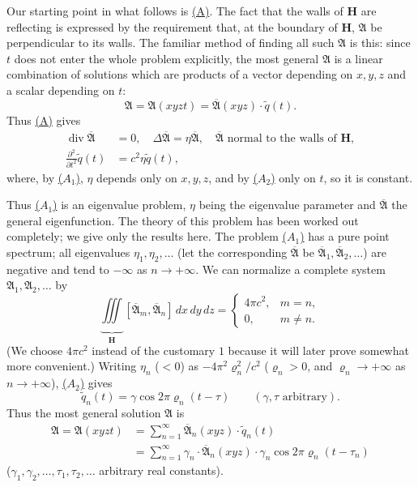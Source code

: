 \documentclass[fontsize=13pt,twoside,openany,headings=normal,parskip=false,bookmarkpackage=false,DIV=calc]{scrbook}
\begin{document}
Our starting point in what follows is \hyperref[eq:III.6.A]{(A)}. The fact that the walls of $\boldsymbol H$ are reflecting is expressed by the requirement that, at the boundary of $\boldsymbol H$, $\mathfrak A$ be perpendicular to its walls. The familiar method of finding all such $\mathfrak A$ is this: since $t$ does not enter the whole problem explicitly, the most general $\mathfrak A$ is a linear combination of solutions which are products of a vector depending on $x,y,z$ and a scalar depending on $t$:
\[
 \mathfrak A=\mathfrak A(xyzt)=\overline{\mathfrak A}(xyz)\cdot\widetilde q(t).
\]
Thus \hyperref[eq:III.6.A]{(A)} gives
\begin{align}
 \operatorname{div}\overline{\mathfrak A}&=0,\quad
 \Delta\overline{\mathfrak A}=\eta\overline{\mathfrak A},\quad
 \overline{\mathfrak A}\text{ normal to the walls of }\boldsymbol H,
 \tag{$A_1$}\label{eq:III.6.A1}\\
 \frac{\partial^2}{\partial t^2}\widetilde q(t)&=c^2\eta\widetilde q(t),
 \tag{$A_2$}\label{eq:III.6.A2}
\end{align}
where, by \hyperref[eq:III.6.A1]{($A_1$)}, $\eta$ depends only on $x,y,z$, and by \hyperref[eq:III.6.A2]{($A_2$)} only on $t$, so it is constant.

Thus \hyperref[eq:III.6.A1]{($A_1$)} is an eigenvalue problem, $\eta$ being the eigenvalue parameter and $\overline{\mathfrak A}$ the general eigenfunction. The theory of this problem has been worked out completely; we give only the results here. The problem \hyperref[eq:III.6.A1]{($A_1$)} has a pure point spectrum; all eigenvalues $\eta_1,\eta_2,\ldots$ (let the corresponding $\overline{\mathfrak A}$ be $\overline{\mathfrak A}_1,\overline{\mathfrak A}_2,\ldots$) are negative and tend to $-\infty$ as $n\longrightarrow+\infty$. We can normalize a complete system $\mathfrak A_1,\mathfrak A_2,\ldots$ by
\[
 \underbrace{\iiint}_{\boldsymbol H}[\overline{\mathfrak A}_m,\overline{\mathfrak A}_n]\,dx\,dy\,dz
 =\begin{cases}4\pi c^2,&m=n,\\0,&m\ne n.\end{cases}
\]
\hypertarget{origpage-138}{}%
(We choose $4\pi c^2$ instead of the customary $1$ because it will later prove somewhat more convenient.) Writing $\eta_n$ ($<0$) as $-4\pi^2\varrho_n^2/c^2$ ($\varrho_n>0$, and $\varrho_n\longrightarrow+\infty$ as $n\longrightarrow+\infty$), \hyperref[eq:III.6.A2]{($A_2$)} gives
\[
 \widetilde q_n(t)=\gamma\cos2\pi\varrho_n(t-\tau)
 \qquad(\gamma,\tau\text{ arbitrary}).
\]
Thus the most general solution $\mathfrak A$ is
\begin{align*}
 \mathfrak A=\mathfrak A(xyzt)
 &=\sum_{n=1}^{\infty}\overline{\mathfrak A}_n(xyz)\cdot\widetilde q_n(t)\\
 &=\sum_{n=1}^{\infty}\gamma_n\cdot\overline{\mathfrak A}_n(xyz)\cdot\gamma_n
 \cos2\pi\varrho_n(t-\tau_n)
\end{align*}
($\gamma_1,\gamma_2,\ldots,\tau_1,\tau_2,\ldots$ arbitrary real constants).
\end{document}
